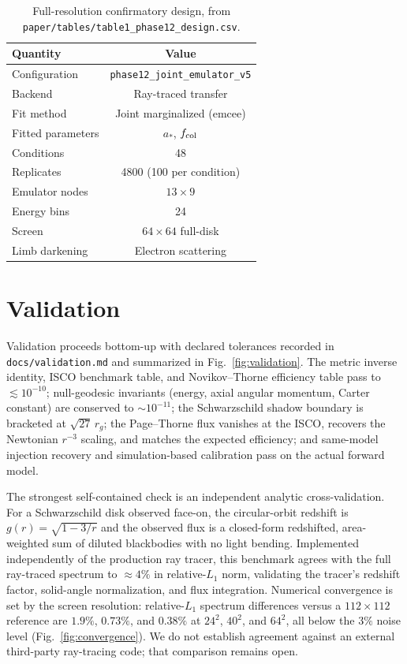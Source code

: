 \documentclass[aip,reprint,amsmath,amssymb]{revtex4-2}
\begin{document}
\begin{table}[t]
\caption{Full-resolution confirmatory design, from
\texttt{paper/tables/table1\_phase12\_design.csv}.}
\label{tab:design}
\begin{ruledtabular}
\begin{tabular}{lc}
Quantity & Value \\
\hline
Configuration & \texttt{phase12\_joint\_emulator\_v5} \\
Backend & Ray-traced transfer \\
Fit method & Joint marginalized (emcee) \\
Fitted parameters & $a_\ast$, $f_{\rm col}$ \\
Conditions & 48 \\
Replicates & 4800 (100 per condition) \\
Emulator nodes & $13\times9$ \\
Energy bins & 24 \\
Screen & $64\times64$ full-disk \\
Limb darkening & Electron scattering \\
\end{tabular}
\end{ruledtabular}
\end{table}

\section{Validation}

Validation proceeds bottom-up with declared tolerances recorded in
\texttt{docs/validation.md} and summarized in Fig.~\ref{fig:validation}. The
metric inverse identity, ISCO benchmark table, and Novikov--Thorne efficiency
table pass to $\lesssim 10^{-10}$; null-geodesic invariants (energy, axial
angular momentum, Carter constant) are conserved to $\sim 10^{-11}$; the
Schwarzschild shadow boundary is bracketed at $\sqrt{27}\,r_g$; the Page--Thorne
flux vanishes at the ISCO, recovers the Newtonian $r^{-3}$ scaling, and matches
the expected efficiency; and same-model injection recovery and simulation-based
calibration pass on the actual forward model.

The strongest self-contained check is an independent analytic cross-validation.
For a Schwarzschild disk observed face-on, the circular-orbit redshift is
$g(r)=\sqrt{1-3/r}$ and the observed flux is a closed-form redshifted,
area-weighted sum of diluted blackbodies with no light bending. Implemented
independently of the production ray tracer, this benchmark agrees with the full
ray-traced spectrum to $\approx 4\%$ in relative-$L_1$ norm, validating the
tracer's redshift factor, solid-angle normalization, and flux integration.
Numerical convergence is set by the screen resolution: relative-$L_1$ spectrum
differences versus a $112\times112$ reference are $1.9\%$, $0.73\%$, and $0.38\%$
at $24^2$, $40^2$, and $64^2$, all below the $3\%$ noise level
(Fig.~\ref{fig:convergence}). We do not establish agreement against an external
third-party ray-tracing code; that comparison remains open.
\end{document}
